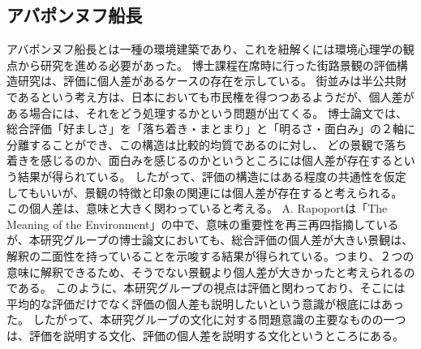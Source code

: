 \subsection{アバポンヌフ船長}
アバポンヌフ船長とは一種の環境建築であり、これを紐解くには環境心理学の観点から研究を進める必要があった。
博士課程在席時に行った街路景観の評価構造研究は、評価に個人差があるケースの存在を示している。
街並みは半公共財であるという考え方は、日本においても市民権を得つつあるようだが、個人差がある場合には、それをどう処理するかという問題が出てくる。
博士論文では、総合評価「好ましさ」を「落ち着き・まとまり」と「明るさ・面白み」の２軸に分離することができ、この構造は比較的均質であるのに対し、
どの景観で落ち着きを感じるのか、面白みを感じるのかというところには個人差が存在するという結果が得られている。
したがって、評価の構造にはある程度の共通性を仮定してもいいが、景観の特徴と印象の関連には個人差が存在すると考えられる。
この個人差は、意味と大きく関わっていると考える。
A. Rapoportは「The Meaning of the Environment」の中で、意味の重要性を再三再四指摘しているが、本研究グループの博士論文においても、総合評価の個人差が大きい景観は、解釈の二面性を持っていることを示唆する結果が得られている。つまり、２つの意味に解釈できるため、そうでない景観より個人差が大きかったと考えられるのである。
このように、本研究グループの視点は評価と関わっており、そこには平均的な評価だけでなく評価の個人差も説明したいという意識が根底にはあった。
したがって、本研究グループの文化に対する問題意識の主要なものの一つは、評価を説明する文化、評価の個人差を説明する文化というところにある。

